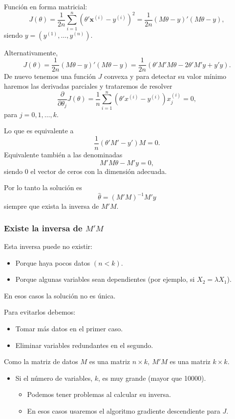 Función en forma matricial: \[ J(\theta)=\dfrac{1}{2n}\sum_{i=1}^{n}\left(\theta'\mathbf{x}^{(i)}-y^{(i)}\right)^2=\dfrac{1}{2n}(M\theta-y)'(M\theta-y), \]siendo $y=\left(y^{(1)},\dots,y^{(n)}\right)$.

Alternativamente, \[ J(\theta)=\dfrac{1}{2n}(M\theta-y)'(M\theta-y)=\dfrac{1}{2n}(\theta'M'M\theta-2\theta'M'y+y'y). \]
De nuevo tenemos una función $J$ convexa y para detectar su valor mínimo haremos las derivadas parciales y trataremos de resolver \[ \dfrac{\partial}{\partial\theta_j}J(\theta)=\dfrac{1}{n}\sum_{i=1}^{n}\left(\theta'x^{(i)}-y^{(i)}\right)x_j^{(i)}=0, \]para $j=0,1,\dots,k$.

Lo que es equivalente a \[ \dfrac{1}{n}(\theta'M'-y')M=0. \]
Equivalente también a las denominadas \[ M'M\theta-M'y=0, \]siendo $0$ el vector de ceros con la dimensión adecuada.

Por lo tanto la solución es \[ \hat{\theta}=(M'M)^{-1}M'y \]siempre que exista la inversa de $M'M$.
\subsubsection*{Existe la inversa de $M'M$}
Esta inversa puede no existir:
\begin{itemize}[label=$-$]
	\item Porque haya pocos datos $(n<k)$.
	\item Porque algunas variables sean dependientes (por ejemplo, si $X_2=\lambda X_1$).
\end{itemize}
En esos casos la solución no es única.

Para evitarlos debemos:
\begin{itemize}[label=$-$]
	\item Tomar más datos en el primer caso.
	\item Eliminar variables redundantes en el segundo.
\end{itemize}
Como la matriz de datos $M$ es una matriz $n\times k,\:M'M$ es una matriz $k\times k$.
\begin{itemize}[label=$-$]
	\item Si el número de variables, $k$, es muy grande (mayor que 10000).
	\begin{itemize}[label=\textbullet]
		\item Podemos tener problemas al calcular su inversa.
		\item En esos casos usaremos el algoritmo gradiente descendiente para $J$.
	\end{itemize}
\end{itemize}
